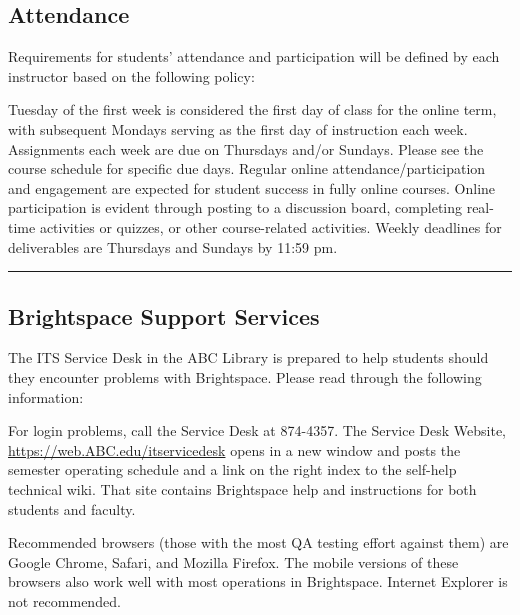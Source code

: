
\subsection*{Attendance}
 
Requirements for students’ attendance and participation will be defined by each instructor based on the following policy:
\begin{outline}
	\1	Tuesday of the first week is considered the first day of class for the online term, with subsequent Mondays serving as the first day of instruction each week. Assignments each week are due on Thursdays and/or Sundays. Please see the course schedule for specific due days.
	\1	Regular online attendance/participation and engagement are expected for student success in fully online courses. Online participation is evident through posting to a discussion board, completing real-time activities or quizzes, or other course-related activities.
	\1	Weekly deadlines for deliverables are Thursdays and Sundays by 11:59 pm.
\end{outline}
\vspace{2ex}\hrule\vspace{2ex}




\subsection*{Brightspace Support Services}
The ITS Service Desk in the ABC Library is prepared to help students should they encounter problems with Brightspace. Please read through the following information:
\begin{outline}
	\1	For login problems, call the Service Desk at 874-4357.
	\1	The Service Desk Website, \url{https://web.ABC.edu/itservicedesk} opens in a new window and posts the semester operating schedule and a link on the right index to the self-help technical wiki. That site contains Brightspace help and instructions for both students and faculty.
\end{outline}


Recommended browsers (those with the most QA testing effort against them) are Google Chrome, Safari, and Mozilla Firefox. The mobile versions of these browsers also work well with most operations in Brightspace. Internet Explorer is not recommended.


